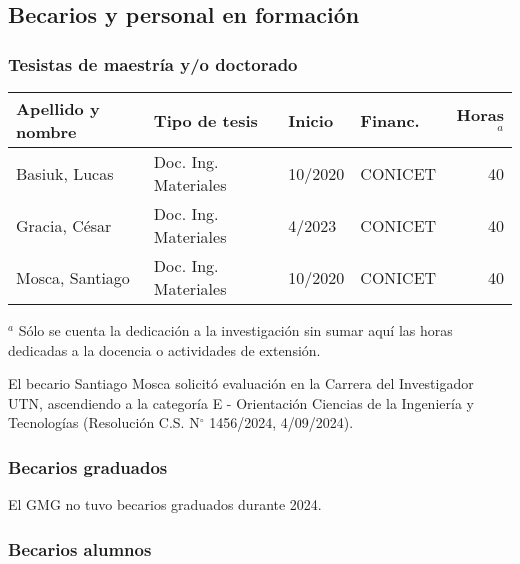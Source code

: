\documentclass[a4paper,11pt,twoside,final,titlepage,onecolumn,openright]{report}
\begin{document}

\subsection{Becarios y personal en formación}

\subsubsection{Tesistas de maestría y/o doctorado}
\begin{tabular}{l l l l r}
\toprule
Apellido y nombre & Tipo de tesis & Inicio & Financ. & Horas$^a$ \\
\midrule
Basiuk, Lucas & Doc. Ing. Materiales & 10/2020 &  CONICET & 40 \\
Gracia, César & Doc. Ing. Materiales & 4/2023 &  CONICET & 40 \\
Mosca, Santiago & Doc. Ing. Materiales & 10/2020 &  CONICET & 40\\
\bottomrule
\end{tabular}

\normalsize
\vspace{0.5cm}
$^a$ Sólo se cuenta la dedicación a la investigación sin sumar aquí las horas dedicadas a la docencia o actividades de extensión.

El becario Santiago Mosca solicitó evaluación en la Carrera del Investigador UTN, ascendiendo a la categoría E - Orientación Ciencias de la Ingeniería y Tecnologías (Resolución C.S. N$^{\circ}$ 1456/2024, 4/09/2024).

\subsubsection{Becarios graduados}

El GMG no tuvo becarios graduados durante 2024.
%

\subsubsection{Becarios alumnos}
\end{document}
